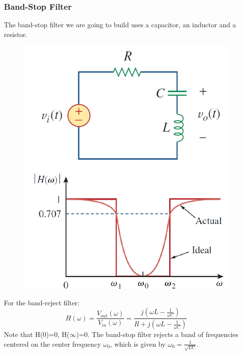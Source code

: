 \documentclass[12pt]{article}
\begin{document}
\subsubsection{Band-Stop Filter}
The band-stop filter we are going to build uses a capacitor, an inductor and a resistor.
\begin{figure}[H]
\centering
\includegraphics[scale=0.5]{P6.jpg}
\end{figure}
For the band-reject filter:
$$H(\omega)=\frac{V_{out}(\omega)}{V_{in}(\omega)}=\frac{j(\omega L-\frac{1}{\omega C})}{R+j(\omega L-\frac{1}{\omega C})}$$
Note that H(0)=0, H($\infty$)=0. The band-stop filter rejects a band of frequencies centered on the center frequency $\omega_0$, which is given by $\omega_0=\frac{1}{\sqrt{LC}}$.
\end{document}
